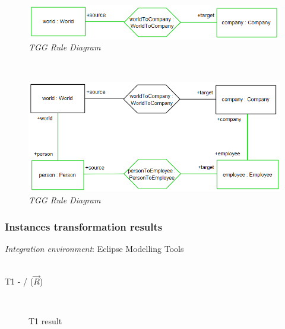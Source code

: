 \documentclass{article}
\begin{document}
\begin{figure}[ht]
  \centering 
  \includegraphics[scale=0.5]{graphics/bij-world-to-company-rule.png}
  \caption{\textit{TGG Rule Diagram}}
  \label{fig:bij-world-to-company-rule}
\end{figure}

~\\

\begin{figure}[ht]
  \centering 
  \includegraphics[scale=0.5]{graphics/bij-person-to-employee.png}
  \caption{\textit{TGG Rule Diagram}}
  \label{fig:bij-person-to-employee}
\end{figure}

\subsubsection{Instances transformation results}

\textit{Integration environment}: Eclipse Modelling Tools~\cite{EMT}

~\\

T1 -  /  ($\overrightarrow{R}$)
\begin{figure}[ht]
    \centering
    \mbox{\quad\qquad
          }
    \caption{T1 result}
    \label{fig:T1}
\end{figure}
\end{document}
